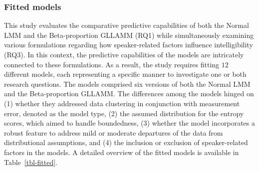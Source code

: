 \documentclass[
  authoryear,
  preprint,
  1p]{elsarticle}
\begin{document}
\subsubsection{Fitted models}\label{sec-M-SM-FM}

This study evaluates the comparative predictive capabilities of both the
Normal LMM and the Beta-proportion GLLAMM (RQ1) while simultaneously
examining various formulations regarding how speaker-related factors
influence intelligibility (RQ3). In this context, the predictive
capabilities of the models are intricately connected to these
formulations. As a result, the study requires fitting \(12\) different
models, each representing a specific manner to investigate one or both
research questions. The models comprised six versions of both the Normal
LMM and the Beta-proportion GLLAMM. The differences among the models
hinged on (1) whether they addressed data clustering in conjunction with
measurement error, denoted as the model type, (2) the assumed
distribution for the entropy scores, which aimed to handle boundedness,
(3) whether the model incorporates a robust feature to address mild or
moderate departures of the data from distributional assumptions, and (4)
the inclusion or exclusion of speaker-related factors in the models. A
detailed overview of the fitted models is available in
Table~\ref{tbl-fitted}.
\end{document}
